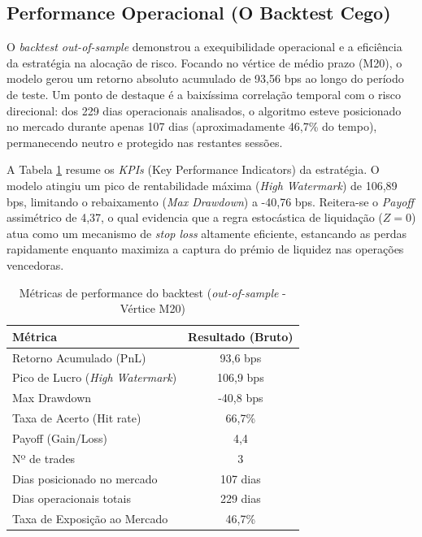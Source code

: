 \documentclass[fleqn]{rbfin}
\begin{document}
\subsection{Performance Operacional (O Backtest Cego)}

O \textit{backtest out-of-sample} demonstrou a exequibilidade operacional e a eficiência da estratégia na alocação de risco. Focando no vértice de médio prazo (M20), o modelo gerou um retorno absoluto acumulado de 93,56 bps ao longo do período de teste. Um ponto de destaque é a baixíssima correlação temporal com o risco direcional: dos 229 dias operacionais analisados, o algoritmo esteve posicionado no mercado durante apenas 107 dias (aproximadamente 46,7\% do tempo), permanecendo neutro e protegido nas restantes sessões. 

A Tabela \ref{tab:performance} resume os \textit{KPIs} (Key Performance Indicators) da estratégia. O modelo atingiu um pico de rentabilidade máxima (\textit{High Watermark}) de 106,89 bps, limitando o rebaixamento (\textit{Max Drawdown}) a -40,76 bps. Reitera-se o \textit{Payoff} assimétrico de 4,37, o qual evidencia que a regra estocástica de liquidação ($Z=0$) atua como um mecanismo de \textit{stop loss} altamente eficiente, estancando as perdas rapidamente enquanto maximiza a captura do prémio de liquidez nas operações vencedoras.

\begin{table}[H]
\centering
\caption{Métricas de performance do backtest (\textit{out-of-sample} - Vértice M20)}
\label{tab:performance}
\begin{tabular}{lc}
\toprule
\textbf{Métrica}             & \textbf{Resultado (Bruto)} \\ 
\midrule
Retorno Acumulado (PnL)      & 93,6 bps                  \\
Pico de Lucro (\textit{High Watermark}) & 106,9 bps      \\
Max Drawdown                 & -40,8 bps                 \\
Taxa de Acerto (Hit rate)    & 66,7\%                     \\
Payoff (Gain/Loss)           & 4,4                       \\
Nº de trades                 & 3                          \\
Dias posicionado no mercado  & 107 dias                   \\
Dias operacionais totais     & 229 dias                   \\
Taxa de Exposição ao Mercado & 46,7\%                     \\ 
\bottomrule
\end{tabular}
\end{table}
\end{document}
